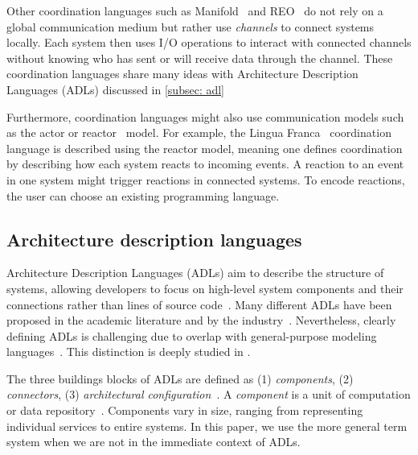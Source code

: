 \documentclass[runningheads]{llncs}
\begin{document}
Other coordination languages such as Manifold~\cite{arbabOverviewManifoldIts1993,papadopoulosModellingActivitiesInformation1998} and REO~\cite{arbabReoChannelbasedCoordination2004} do not rely on a global communication medium but rather use \textit{channels} to connect systems locally.
Each system then uses I/O operations to interact with connected channels without knowing who has sent or will receive data through the channel.
These coordination languages share many ideas with Architecture Description Languages (ADLs) %
discussed in \autoref{subsec: adl}

Furthermore, coordination languages might also use communication models such as the actor or reactor~\cite{lohstrohReactorsDeterministicModel2020} model.
For example, the Lingua Franca~\cite{lohstrohReactorsDeterministicModel2020,lohstrohLinguaFrancaDeterministic2021} coordination language is described using the reactor model, meaning one defines coordination by describing how each system reacts to incoming events.
A reaction to an event in one system might trigger reactions in connected systems.
To encode reactions, the user can choose an existing programming language.

\subsection{Architecture description languages} \label{subsec: adl}
Architecture Description Languages (ADLs) aim to describe the structure of systems, allowing developers to focus on high-level system components and their connections rather than lines of source code~\cite{clementsSurveyArchitectureDescription1996,medvidovicClassificationComparisonFramework2000,medvidovicFrameworkClassifyingComparing1997}.
Many different ADLs have been proposed in the academic literature and by the industry~\cite{medvidovicClassificationComparisonFramework2000,woodsArchitectureDescriptionLanguages2005}.
Nevertheless, clearly defining ADLs is challenging due to overlap with general-purpose modeling languages~\cite{clementsSurveyArchitectureDescription1996}.
This distinction is deeply studied in \cite{medvidovicClassificationComparisonFramework2000}.

The three buildings blocks of ADLs are defined as (1) \textit{components}, (2) \textit{connectors}, (3) \textit{architectural configuration}~\cite{medvidovicClassificationComparisonFramework2000,medvidovicFrameworkClassifyingComparing1997}.
A \textit{component} is a unit of computation or data repository~\cite{medvidovicClassificationComparisonFramework2000}.
Components vary in size, ranging from representing individual services to entire systems.
In this paper, we use the more general term system when we are not in the immediate context of ADLs.
\end{document}

